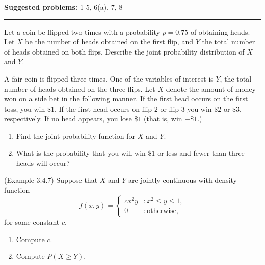 \documentclass[12pt,reqno]{amsart}
\begin{document}
\textbf{Suggested problems:} 1-5, 6(a), 7, 8

\bigskip
\hrule

\bigskip
\prob Let a coin be flipped two times with a probability $p=0.75$ of obtaining heads. Let $X$ be the number of heads obtained on the first flip, and $Y$ the total number of heads obtained on both flips. Describe the joint probability distribution of $X$ and $Y$.

\vfill
\prob A fair coin is flipped three times. One of the variables of interest is $Y$, the total number of heads obtained on the three flips. Let $X$ denote the amount of money won on a side bet	 in the following manner. If the first head occurs on the first toss, you win $\$1$. If the first head occurs on flip $2$ or flip $3$ you win $\$2$ or $\$3$, respectively. If no head appears, you lose $\$1$ (that is, win $-\$1$.)

\medskip
\begin{enumerate}
\item Find the joint probability function for $X$ and $Y$.\vfill
\item What is the probability that you will win $\$1$ or less and fewer than three heads will occur?\vfill
\end{enumerate}

\newpage
\prob (Example 3.4.7) Suppose that $X$ and $Y$ are jointly continuous with density function
	\[
	f(x,y) = \begin{cases}
	cx^2 y & : x^2 \leq y \leq 1, \\
	0 & : \text{otherwise},
	\end{cases}
	\]
for some constant $c$.

\medskip
\begin{enumerate}
\item Compute $c$.\vfill
\item Compute $P(X\geq Y)$.\vfill
\end{enumerate}
\end{document}
